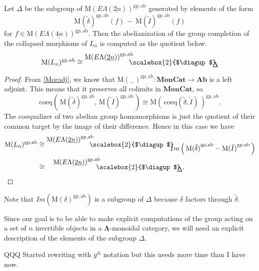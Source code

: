 \documentclass{amsbook} %
\newcommand{\mb}{\mathbf}
\newcommand{\ML}{\mathbf{\Lambda}}
\newcommand{\bigquotient}[2]{ \raisebox{0.75\height}{$#1$} \mkern-12mu\scalebox{2}{$\diagup$}\mkern-10mu \raisebox{-0.5\height}{$#2$} }
\newcommand{\ELnn}{E\Lambda(\underline{2n})}
\newcommand{\ELnnnn}{E\Lambda(\underline{4n})}
\newcommand{\moncat}{\ensuremath{\mb{MonCat}}}
\numberwithin{section}{chapter}
\begin{document}
\begin{prop}\label{Zmor2} Let $\Delta$ be the subgroup of $\mathrm{M}(\ELnn)^{\mathrm{gp, ab}}$ generated by elements of the form
  \[
    \mathrm{M}(\tilde{\delta})^{\mathrm{gp, ab}}(f) \, - \, \mathrm{M}(\tilde{I})^{\mathrm{gp, ab}}(f)
  \]
for $f \in \mathrm{M}(\ELnnnn)^{\mathrm{gp, ab}}$.
Then the abelianization of the group completion of the collapsed morphisms of $L_n$ is computed as the quotient below.
  \[
    \mathrm{M}(L_{n})^{\mathrm{gp, ab}} \cong \bigquotient{{\mathrm{M}(\ELnn)}^{\mathrm{gp, ab}}}{\Delta}
  \]
\end{prop}
\begin{proof}
From \cref{Moradj}, we know that $\mathrm{M}(\, \_ \,)^{\mathrm{gp, ab}} \colon  \moncat \rightarrow \mb{Ab}$ is a left adjoint. This means that it preserves all colimits in $\moncat$, so
  \[
    \mathrm{coeq}\left( \, \mathrm{M}(\tilde{\delta})^{\mathrm{gp, ab}}, \, \mathrm{M}(\tilde{I})^{\mathrm{gp, ab}} \, \right) \cong \mathrm{M}\left( \, \mathrm{coeq}(\tilde{\delta}, \tilde{I}) \, \right)^{\mathrm{gp, ab}}.
  \]
The coequalizer of two abelian group homomorphisms is just the quotient of their common target by the image of their difference. Hence in this case we have
  \begin{align*}
    \mathrm{M}(L_{n})^{\mathrm{gp, ab}}  &\cong \bigquotient{{\mathrm{M}(\ELnn)}^{\mathrm{gp, ab}}}{Im\left( \, {\mathrm{M}(\tilde{\delta})}^{\mathrm{gp, ab}} - {\mathrm{M}(\tilde{I})}^{\mathrm{gp, ab}} \, \right)} \\
    & \cong \quad \bigquotient{{\mathrm{M}(\ELnn)}^{\mathrm{gp, ab}}}{\Delta}.
  \end{align*}
\end{proof} 

\begin{rem}\label{delta_neq_image}
Note that $Im(\mathrm{M}(\delta)^{\mathrm{gp, ab}})$ is a subgroup of $\Delta$ because $\delta$ factors through $\tilde{\delta}$.
\end{rem}




Since our goal is to be able to make explicit computations of the group acting on a set of $n$ invertible objects in a $\ML$-monoidal category, we will need an explicit description of the elements of the subgroup $\Delta$.

QQQ Started rewriting with $g^{\otimes}$ notation but this needs more time than I have now.
\end{document}
